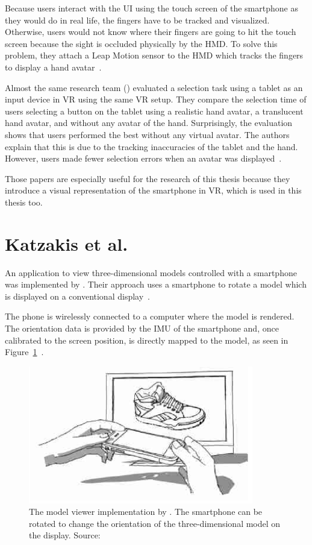Because users interact with the \gls{UI} using the touch screen of the smartphone as they would do in real life, the fingers have to be tracked and visualized. Otherwise, users would not know where their fingers are going to hit the touch screen because the sight is occluded physically by the \gls{HMD}. To solve this problem, they attach a Leap Motion sensor to the \gls{HMD} which tracks the fingers to display a hand avatar~\cite{Dias.2018}.

Almost the same research team (\citeauthor{Afonso.2017}) evaluated a selection task using a tablet as an input device in \gls{VR} using the same \gls{VR} setup. They compare the selection time of users selecting a button on the tablet using a realistic hand avatar, a translucent hand avatar, and without any avatar of the hand. Surprisingly, the evaluation shows that users performed the best without any virtual avatar. The authors explain that this is due to the tracking inaccuracies of the tablet and the hand. However, users made fewer selection errors when an avatar was displayed~\cite[247-248]{Afonso.2017}.

Those papers are especially useful for the research of this thesis because they introduce a visual representation of the smartphone in \gls{VR}, which is used in this thesis too. 


\section{Katzakis et al.}\label{section:katzakis-2010}
An application to view three-dimensional models controlled with a smartphone was implemented by \citeauthor{Katzakis.2010}. Their approach uses a smartphone to rotate a model which is displayed on a conventional display~\cite[139]{Katzakis.2010}. 

The phone is wirelessly connected to a computer where the model is rendered. The orientation data is provided by the \gls{IMU} of the smartphone and, once calibrated to the screen position, is directly mapped to the model, as seen in Figure~\ref{fig:katzakis-2010}~\cite[139]{Katzakis.2010}. 

\begin{figure}[H]%
  \centering%
  \includegraphics[height=6cm]{figures/related_work/katzakis_2010_3d_object.png}%
  \caption[Model viewer implementation by Katzakis et al.]{
  The model viewer implementation by \citeauthor{Katzakis.2010}. The smartphone can be rotated to change the orientation of the three-dimensional model on the display.
  \newline{}
  Source:~\cite[Figure 1]{Katzakis.2010}}\label{fig:katzakis-2010}
\end{figure}


